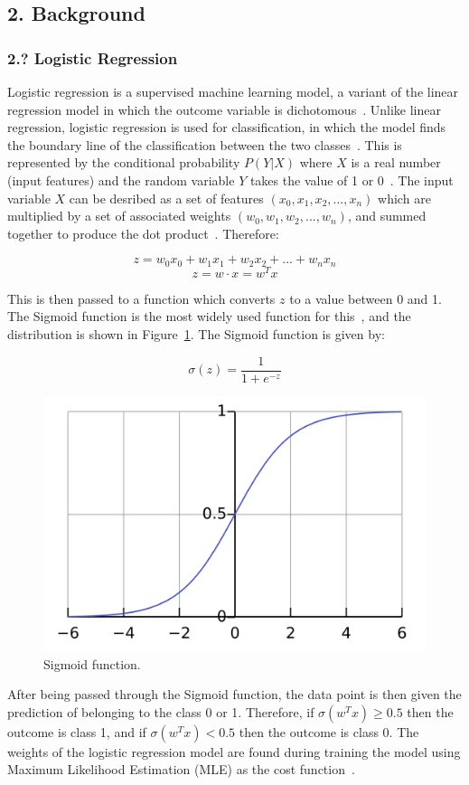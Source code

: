 \documentclass[12pt]{article}
\begin{document}
\newpage
\subsection*{2. Background}
\subsubsection*{2.? Logistic Regression}
Logistic regression is a supervised machine learning model, a variant of the linear regression model in which the outcome variable is dichotomous~\cite{Hosmer2013}. Unlike linear regression, logistic regression is used for classification, in which the model finds the boundary line of the classification between the two classes~\cite{Zou2019}. This is represented by the conditional probability \(P(Y|X)\) where \(X\) is a real number (input features) and the random variable \(Y\) takes the value of 1 or 0~\cite{Li2024}. The input variable \(X\) can be desribed as a set of features \((x_0, x_1, x_2, ..., x_n)\) which are multiplied by a set of associated weights \((w_0, w_1, w_2, ..., w_n)\), and summed together to produce the dot product~\cite{Zou2019}. Therefore:

\[z = w_{0}x_{0}+ w_{1}x_{1} + w_{2}x_{2} + ... + w_{n}x_{n}\]
\[z = w \cdot x = w^{T}x\]

This is then passed to a function which converts \(z\) to a value between 0 and 1. The Sigmoid function is the most widely used function for this~\cite{Zou2019}, and the distribution is shown in Figure~\ref{fig:sigmoid}. The Sigmoid function is given by:

\[\sigma(z) = \frac{1}{1 + e^{-z}}\]

\begin{figure} [H]
  \centering
  \includegraphics[width=0.7\linewidth]{sigmoid}
  \caption{Sigmoid function.}\label{fig:sigmoid}
\end{figure}  


After being passed through the Sigmoid function, the data point is then given the prediction of belonging to the class 0 or 1. Therefore, if \(\sigma(w^{T}x) \geq 0.5\) then the outcome is class 1, and if \(\sigma(w^{T}x) < 0.5\) then the outcome is class 0. The weights of the logistic regression model are found during training the model using Maximum Likelihood Estimation (MLE) as the cost function~\cite{Li2024}.
\end{document}
